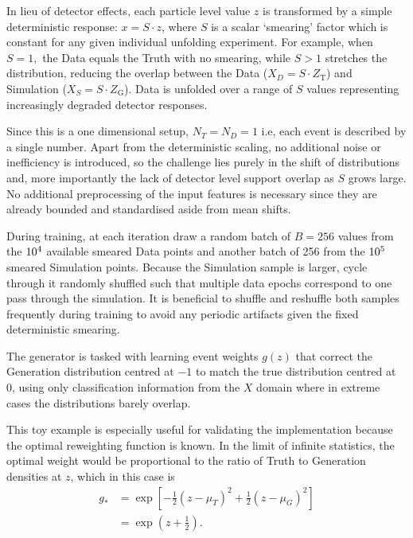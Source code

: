 {{            In lieu of detector effects, each particle level value $z$ is transformed by a simple deterministic response: $x = S \cdot z$, where $S$ is a scalar `smearing' factor which is constant for any given individual unfolding experiment.
            For example, when $S=1,$ the Data equals the Truth with no smearing, while $S>1$ stretches the distribution, reducing the overlap between the Data ($X_D = S\cdot Z_{\text{T}}$) and Simulation ($X_S = S\cdot Z_{\text{G}}$).
            Data is unfolded over a range of \(S\) values representing increasingly degraded detector responses.
            
            Since this is a one dimensional setup, \(N_T = N_D = 1\) i.e, each event is described by a single number.
            Apart from the deterministic scaling, no additional noise or inefficiency is introduced, so the challenge lies purely in the shift of distributions and, more importantly the lack of detector level support overlap as $S$ grows large.
            No additional preprocessing of the input features is necessary since they are already bounded and standardised aside from mean shifts.
            
            During training, at each iteration draw a random batch of $B=256$ values from the $\num{d4}$ available smeared Data points and another batch of 256 from the $\num{d5}$ smeared Simulation points.
            Because the Simulation sample is larger, cycle through it randomly shuffled such that multiple data epochs correspond to one pass through the simulation.
            It is beneficial to shuffle and reshuffle both samples frequently during training to avoid any periodic artifacts given the fixed deterministic smearing.
            
            The generator is tasked with learning event weights $g(z)$ that correct the Generation distribution centred at $-1$ to match the true distribution centred at 0, using only classification information from the $X$ domain where in extreme cases the distributions barely overlap.
            
            This toy example is especially useful for validating the implementation because the optimal reweighting function is known.
            In the limit of infinite statistics, the optimal weight would be proportional to the ratio of Truth to Generation densities at $z$, which in this case is
            \begin{align}
                g_* &= \exp[-\frac12(z-\mu_{T})^2 + \frac12(z-\mu_{G})^2]\\
                    &=\exp(z + \frac12).
            \end{align}
            
}}
